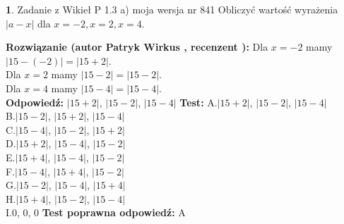 \documentclass[12pt, a4paper]{article}
\theoremstyle{definition} %
\newtheorem{zad}{}
\newcommand{\zadStart}[1]{\begin{zad}#1\newline}
\newcommand{\zadStop}{\end{zad}}
\newcommand{\rozwStart}[2]{\noindent \textbf{Rozwiązanie (autor #1 , recenzent #2): }\newline}
\newcommand{\rozwStop}{\newline}
\newcommand{\odpStart}{\noindent \textbf{Odpowiedź:}\newline}
\newcommand{\odpStop}{\newline}
\newcommand{\testStart}{\noindent \textbf{Test:}\newline}
\newcommand{\testStop}{\newline}
\newcommand{\kluczStart}{\noindent \textbf{Test poprawna odpowiedź:}\newline}
\newcommand{\kluczStop}{\newline}
\begin{document}
\zadStart{Zadanie z Wikieł P 1.3 a) moja wersja nr 841}
Obliczyć wartość wyrażenia $|a - x|$ dla $x=-2,x=2,x=4$.
\zadStop
\rozwStart{Patryk Wirkus}{}
Dla $x = -2$ mamy $|15 - (-2)| = |15 + 2|$.\\
Dla $x = 2$ mamy $|15 - 2| = |15 - 2|$.\\
Dla $x = 4$ mamy $|15 - 4| = |15 - 4|$.\\
\rozwStop
\odpStart
$|15 + 2|$, $|15 - 2|$, $|15 - 4|$
\odpStop
\testStart
A.$|15 + 2|$, $|15 - 2|$, $|15 - 4|$\\
B.$|15 - 2|$, $|15 + 2|$, $|15 - 4|$\\
C.$|15 - 4|$, $|15 - 2|$, $|15 + 2|$\\
D.$|15 + 2|$, $|15 - 4|$, $|15 - 2|$\\
E.$|15 + 4|$, $|15 - 4|$, $|15 - 2|$\\
F.$|15 - 4|$, $|15 + 4|$, $|15 - 2|$\\
G.$|15 - 2|$, $|15 - 4|$, $|15 + 4|$\\
H.$|15 + 4|$, $|15 - 2|$, $|15 - 4|$\\
I.$0$, $0$, $0$
\testStop
\kluczStart
A
\kluczStop
\end{document}
